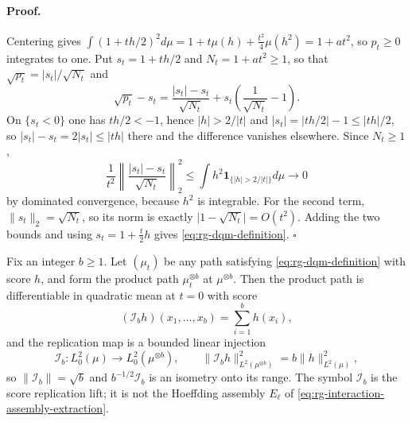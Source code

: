 \paragraph{Proof.}
Centering gives
\(\int(1+th/2)^2 d\mu=1+t\mu(h)+\tfrac{t^2}4\mu(h^2)=1+at^2\), so \(p_t\geq0\)
integrates to one.  Put \(s_t=1+th/2\) and \(N_t=1+at^2\geq1\), so that
\(\sqrt{p_t}=\lvert s_t\rvert/\sqrt{N_t}\) and
\begin{equation}
 \sqrt{p_t}-s_t
 =\frac{\lvert s_t\rvert-s_t}{\sqrt{N_t}}
 +s_t\left(\frac1{\sqrt{N_t}}-1\right).
 \label{eq:rg-quadratic-path-split}
\end{equation}
On \(\{s_t<0\}\) one has \(th/2<-1\), hence \(\lvert h\rvert>2/\lvert t\rvert\)
and \(\lvert s_t\rvert=\lvert th/2\rvert-1\leq\lvert th\rvert/2\), so
\(\lvert s_t\rvert-s_t=2\lvert s_t\rvert\leq\lvert th\rvert\) there and the
difference vanishes elsewhere.  Since \(N_t\geq1\),
\begin{equation}
 \frac1{t^2}\left\lVert
 \frac{\lvert s_t\rvert-s_t}{\sqrt{N_t}}
 \right\rVert_2^2
 \leq\int h^2\mathbf1_{\{\lvert h\rvert>2/\lvert t\rvert\}} d\mu
 \longrightarrow0
 \label{eq:rg-quadratic-path-tail}
\end{equation}
by dominated convergence, because \(h^2\) is integrable.  For the second term,
\(\lVert s_t\rVert_2=\sqrt{N_t}\), so its norm is exactly
\(\lvert1-\sqrt{N_t}\rvert=O(t^2)\).  Adding the two bounds and using
\(s_t=1+\tfrac t2h\) gives \eqref{eq:rg-dqm-definition}. \(\square\)

Fix an integer \(b\geq1\).  Let \((\mu_t)\) be any path satisfying
\eqref{eq:rg-dqm-definition} with score \(h\), and form the product path
\(\mu_t^{\otimes b}\) at \(\mu^{\otimes b}\).  Then the product path is
differentiable in quadratic mean at \(t=0\) with score
\begin{equation}
 (\mathscr I_bh)(x_1,\dots,x_b)=\sum_{i=1}^bh(x_i),
 \label{eq:rg-score-replication}
\end{equation}
and the replication map is a bounded linear injection
\begin{equation}
 \mathscr I_b:L^2_0(\mu)\longrightarrow L^2_0(\mu^{\otimes b}),
 \qquad
 \lVert\mathscr I_bh\rVert_{L^2(\mu^{\otimes b})}^2
 =b\lVert h\rVert_{L^2(\mu)}^2,
 \label{eq:rg-score-replication-norm}
\end{equation}
so \(\lVert\mathscr I_b\rVert=\sqrt b\) and \(b^{-1/2}\mathscr I_b\) is an
isometry onto its range.  The symbol \(\mathscr I_b\) is the score replication
lift; it is not the Hoeffding assembly \(E_\ell\) of
\eqref{eq:rg-interaction-assembly-extraction}. 

